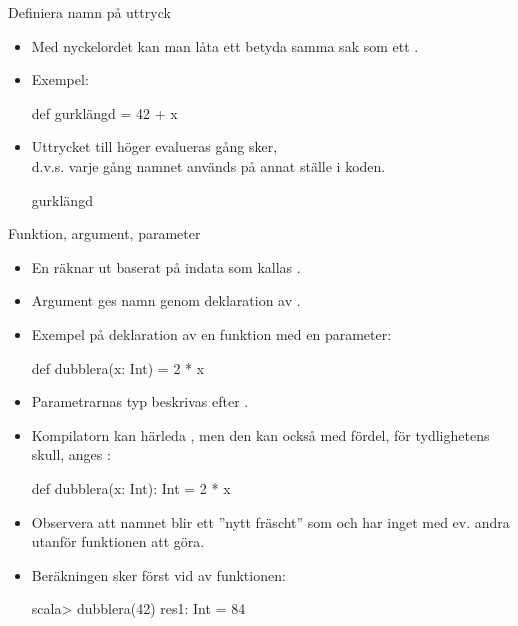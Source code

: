 
\begin{Slide}{Definiera namn på uttryck}
\begin{itemize}
\item Med nyckelordet  kan man låta ett  betyda samma sak som ett .
\item Exempel:
\begin{Code}
def gurklängd = 42 + x
\end{Code}
\item Uttrycket till höger evalueras  gång  sker,\\
d.v.s. varje gång namnet används på annat ställe i koden.
\begin{Code}
gurklängd
\end{Code}

\end{itemize}
\end{Slide}

\begin{Slide}{Funktion, argument, parameter}\SlideFontSmall
\begin{itemize}
\item En  räknar ut  baserat på indata som kallas .

\item Argument ges namn genom deklaration av .

\item Exempel på deklaration av en funktion med en parameter:
\begin{Code}
def dubblera(x: Int) = 2 * x
\end{Code}

\item Parametrarnas typ  beskrivas efter .
\item Kompilatorn kan härleda , men den kan också med fördel, för tydlighetens skull, anges :
\begin{Code}
def dubblera(x: Int): Int = 2 * x
\end{Code}

\item Observera att namnet  blir ett ''nytt fräscht''  som  och har inget med ev. andra  utanför funktionen att göra.

\item Beräkningen sker först vid  av funktionen:
\begin{REPL}
scala> dubblera(42)
res1: Int = 84
\end{REPL}

\end{itemize}
\end{Slide}






